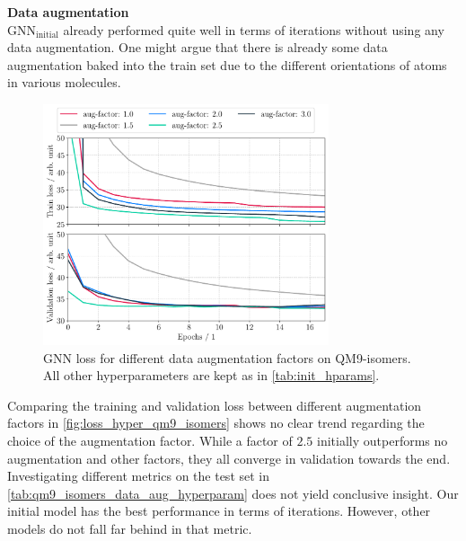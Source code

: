 \textbf{Data augmentation}\\
$\text{GNN}_\text{initial}$ already performed quite well in terms of iterations without using any data augmentation. One might argue that there is already some data augmentation baked into the train set due to the different orientations of atoms in various molecules. 
\begin{figure}[h]
    \centering
    \includegraphics[width=0.75\textwidth]{../fig/application/aug_train_val_loss.pdf}
    \caption[GNN loss for different augmentation factors on QM9-isomers]{GNN loss for different data augmentation factors on QM9-isomers. All other hyperparameters are kept as in \autoref{tab:init_hparams}.}
    \label{fig:loss_hyper_qm9_isomers}
\end{figure}
Comparing the training and validation loss between different augmentation factors in \autoref{fig:loss_hyper_qm9_isomers} shows no clear trend regarding the choice of the augmentation factor. While a factor of $2.5$ initially outperforms no augmentation and other factors, they all converge in validation towards the end. 
Investigating different metrics on the test set in \autoref{tab:qm9_isomers_data_aug_hyperparam} does not yield conclusive insight. Our initial model has the best performance in terms of iterations. However, other models do not fall far behind in that metric.
